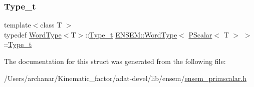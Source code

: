 \subsubsection{\texorpdfstring{Type\_t}{Type\_t}\hspace{0.1cm}{\footnotesize\ttfamily [3/3]}}
{\footnotesize\ttfamily template$<$class T $>$ \\
typedef \mbox{\hyperlink{structENSEM_1_1WordType}{Word\+Type}}$<$T$>$\+::\mbox{\hyperlink{structENSEM_1_1WordType_3_01PScalar_3_01T_01_4_01_4_a18e643a2710c1d27fed12cd1c6b2bfaf}{Type\+\_\+t}} \mbox{\hyperlink{structENSEM_1_1WordType}{E\+N\+S\+E\+M\+::\+Word\+Type}}$<$ \mbox{\hyperlink{classENSEM_1_1PScalar}{P\+Scalar}}$<$ T $>$ $>$\+::\mbox{\hyperlink{structENSEM_1_1WordType_3_01PScalar_3_01T_01_4_01_4_a18e643a2710c1d27fed12cd1c6b2bfaf}{Type\+\_\+t}}}



The documentation for this struct was generated from the following file\+:\begin{DoxyCompactItemize}
\item 
/\+Users/archanar/\+Kinematic\+\_\+factor/adat-\/devel/lib/ensem/\mbox{\hyperlink{adat-devel_2lib_2ensem_2ensem__primscalar_8h}{ensem\+\_\+primscalar.\+h}}\end{DoxyCompactItemize}
